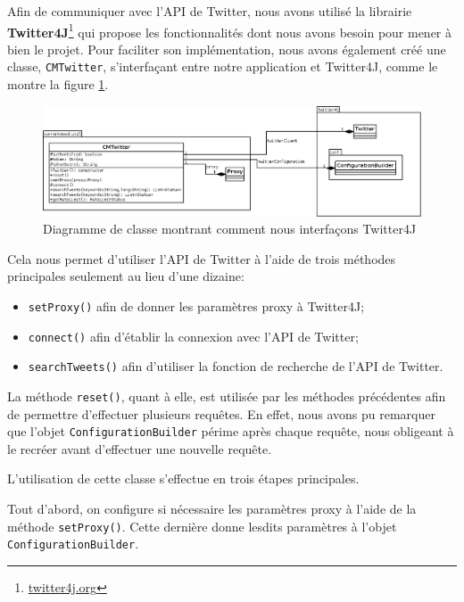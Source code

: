 \documentclass[12pt,a4paper]{report}
\begin{document}
Afin de communiquer avec l'API de Twitter, nous avons utilisé la librairie
\textbf{Twitter4J}\footnote{\href{http://twitter4j.org}{twitter4j.org}} qui
propose les fonctionnalités dont nous avons besoin pour mener à bien le projet.
Pour faciliter son implémentation, nous avons également créé une classe,
\texttt{CMTwitter}, s'interfaçant entre notre application et Twitter4J, comme le
montre la figure \ref{uml_cmtwitter}.

\begin{figure}[h]
    \includegraphics[width=1\textwidth]{img/uml_cmtwitter.png}
    \caption{Diagramme de classe montrant comment nous interfaçons Twitter4J}
    \label{uml_cmtwitter}
\end{figure}

Cela nous permet d'utiliser l'API de Twitter à l'aide de trois méthodes
principales seulement au lieu d'une dizaine:

\begin{itemize}
    \item
        \texttt{setProxy()} afin de donner les paramètres proxy à Twitter4J;
    \item
        \texttt{connect()} afin d'établir la connexion avec l'API de Twitter;
    \item
        \texttt{searchTweets()} afin d'utiliser la fonction de recherche de
        l'API de Twitter.
\end{itemize}

La méthode \texttt{reset()}, quant à elle, est utilisée par les méthodes
précédentes afin de permettre d'effectuer plusieurs requêtes. En effet, nous
avons pu remarquer que l'objet \texttt{ConfigurationBuilder} périme après chaque
requête, nous obligeant à le recréer avant d'effectuer une nouvelle requête.

L'utilisation de cette classe s'effectue en trois étapes principales.

Tout d'abord, on configure si nécessaire les paramètres proxy à l'aide de la
méthode \texttt{setProxy()}. Cette dernière donne lesdits paramètres à l'objet
\texttt{ConfigurationBuilder}.
\end{document}
